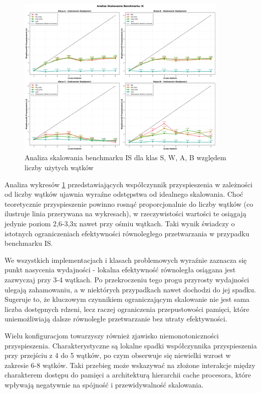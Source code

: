 \begin{figure}[H]
    \centering
    \includegraphics[width=0.9\textwidth]{analiza/images/parallel/is/arm/is_analiza_skalowania.png}
    \caption{Analiza skalowania benchmarku IS dla klas S, W, A, B względem liczby użytych wątków}
    \label{is_analiza_skalowania}
\end{figure}

Analiza wykresów \ref{is_analiza_skalowania} przedstawiających współczynnik przyspieszenia w zależności od liczby wątków ujawnia wyraźne odstępstwa od idealnego skalowania. Choć teoretycznie przyspieszenie powinno rosnąć proporcjonalnie do liczby wątków (co ilustruje linia przerywana na wykresach), w rzeczywistości wartości te osiągają jedynie poziom 2,6-3,3x nawet przy ośmiu wątkach. Taki wynik świadczy o istotnych ograniczeniach efektywności równoległego przetwarzania w przypadku benchmarku IS.

We wszystkich implementacjach i klasach problemowych wyraźnie zaznacza się punkt nasycenia wydajności - lokalna efektywność równoległa osiągana jest zazwyczaj przy 3-4 wątkach. Po przekroczeniu tego progu przyrosty wydajności ulegają zahamowaniu, a w niektórych przypadkach nawet dochodzi do jej spadku. Sugeruje to, że kluczowym czynnikiem ograniczającym skalowanie nie jest sama liczba dostępnych rdzeni, lecz raczej ograniczenia przepustowości pamięci, które uniemożliwiają dalsze równoległe przetwarzanie bez utraty efektywności.

Wielu konfiguracjom towarzyszy również zjawisko niemonotoniczności przyspieszenia. Charakterystyczne są lokalne spadki współczynnika przyspieszenia przy przejściu z 4 do 5 wątków, po czym obserwuje się niewielki wzrost w zakresie 6-8 wątków. Taki przebieg może wskazywać na złożone interakcje między charakterem dostępu do pamięci a architekturą hierarchii cache procesora, które wpływają negatywnie na spójność i przewidywalność skalowania.

